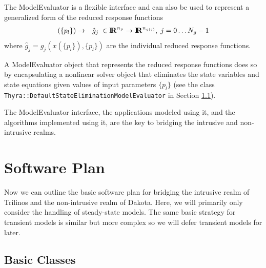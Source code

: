 \documentclass[pdf,ps2pdf,11pt]{SANDreport}
\begin{document}
The ModelEvaluator is a flexible interface and can also be used to represent a
generalized form of the reduced response functions
%
\begin{eqnarray}
(\{ p_l \}) & \rightarrow & \hat{g}_j
\;  \in\mbox{\textbf{I}}\hspace{-0.6ex}\mbox{\textbf{R}}^{n_p} \rightarrow \mbox{\textbf{I}}\hspace{-0.6ex}\mbox{\textbf{R}}^{n_{g(j)}},
\; j=0 \ldots N_g-1
\label{eqn:me:red_response_func}
\end{eqnarray}
%
where $\hat{g}_j = g_j(x(\{p_l\}),\{p_l\})$ are the individual reduced
response functions.

A ModelEvaluator object that represents the reduced response functions does so
by encapsulating a nonlinear solver object that eliminates the state variables
and state equations given values of input parameters $\{p_l\}$ (see the class
{}\texttt{Thyra\-::Default\-State\-Elimination\-Model\-Evaluator} in Section
{}\ref{sec:basic_classes}).

The ModelEvaluator interface, the applications modeled using it, and the
algorithms implemented using it, are the key to bridging the intrusive and
non-intrusive realms.

%
\section{Software Plan}
%

Now we can outline the basic software plan for bridging the intrusive realm of
Trilinos and the non-intrusive realm of Dakota.  Here, we will primarily only
consider the handling of steady-state models.  The same basic strategy for
transient models is similar but more complex so we will defer transient models
for later.

%
\subsection{Basic Classes}
\label{sec:basic_classes}
%
\end{document}
